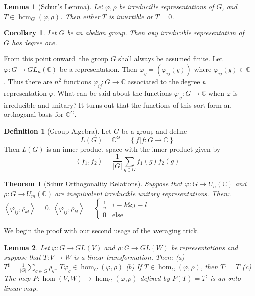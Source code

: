 \documentclass{article}
\newtheorem{Thm}{Theorem}[section]
\newtheorem{corollary}{Corollary}[Thm]
\newtheorem{Lem}{Lemma}[section]
\theoremstyle{definition}
\newtheorem{Def}{Definition}[section]
\begin{document}
\begin{Lem}[Schur's Lemma]
    Let $\varphi,\rho$ be irreducible representations of $G$, and $T\in\hom_G(\varphi,\rho)$. Then either $T$ is invertible or $T=0$.
\end{Lem}

\begin{corollary}
    Let $G$ be an abelian group. Then any irreducible representation of $G$ has degree one.
\end{corollary}

From this point onward, the group $G$ shall always be assumed finite. Let $\varphi:G\to GL_n(\mathbb{C})$ be a representation. Then $\varphi_g=(\varphi_{ij}(g))$ where $\varphi_{ij}(g)\in\mathbb{C}$.
Thus there are $n^2$ functions $\varphi_{ij}:G\to\mathbb{C}$ associated to the degree $n$ representation $\varphi$. What can be said about the functions $\varphi_{ij}:G\to\mathbb{C}$ when $\varphi$ is irreducible and unitary?
It turns out that the functions of this sort form an orthogonal basis for $\mathbb{C}^G$.
\begin{Def}[Group Algebra]
    Let $G$ be a group and define \[L(G)=\mathbb{C}^G=\left\{f|f:G\to\mathbb{C}\right\}\]
    Then $L(G)$ is an inner product space with the inner product given by \[\left\langle f_1,f_2\right\rangle=\frac{1}{\left|G\right|}\sum_{g\in G}f_1(g)\overline{f_2(g)}\]
\end{Def}
\begin{Thm}[Schur Orthogonality Relations]
    Suppose that $\varphi:G\to U_n(\mathbb{C})$ and $\rho:G\to U_m(\mathbb{C})$ are inequivalent irreducible unitary representations. Then:. $\left\langle\varphi_{ij},\rho_{kl}\right\rangle=0$. $\left\langle\varphi_{ij},\rho_{kl}\right\rangle=
    \left\{\begin{matrix}\frac{1}{n}  & i=k\&j=l \\0 & \text{else} \end{matrix}\right. $
\end{Thm}
We begin the proof with our second usage of the averaging trick.
\begin{Lem}
    Let $\varphi:G\to GL(V)$ and $\rho:G\to GL(W)$ be representations and suppose that $T:V\to W$ is a linear transformation. Then:\newline 
    (a) $T^\sharp=\frac{1}{\left|G\right|}\sum_{g\in G}\rho_{g^{-1}}T\varphi_g\in \hom_G(\varphi,\rho)$\newline 
    (b) If $T\in\hom_G(\varphi,\rho)$, then $T^\sharp=T$\newline 
    (c) The map $P:\hom(V,W)\to\hom_G(\varphi,\rho)$ defined by $P(T)=T^\sharp$ is an onto linear map.
\end{Lem}
\end{document}
